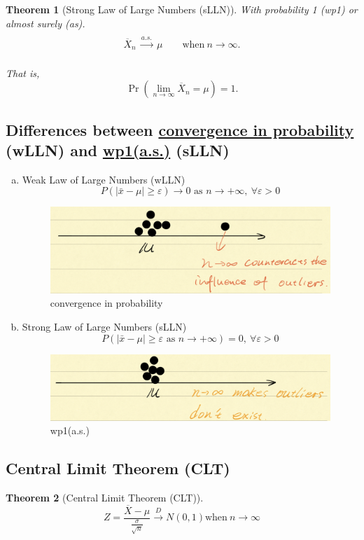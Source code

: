 \documentclass[11pt,a4paper]{article}
\newtheorem{theorem}{Theorem}
\begin{document}
\begin{theorem}[Strong Law of Large Numbers (sLLN)]
    \quad

    With probability 1 (wp1) or almost surely (as).
    $${\displaystyle {\begin{matrix}{}\\{\overline {X}}_{n}\ {\xrightarrow {a.s.}}\ \mu \qquad {\text{when}}\ n\to \infty .\\{}\end{matrix}}}$$

    That is,
    $$\Pr \!\left(\lim _{n\to \infty }{\overline {X}}_{n}=\mu \right)=1.$$
\end{theorem}

\subsection{Differences between \underline{convergence in probability} (wLLN) and \underline{wp1(a.s.)} (sLLN)}
\begin{enumerate}[a)]
    \item Weak Law of Large Numbers (wLLN)
    $$P(|\bar{x}-\mu|\geq\varepsilon)\rightarrow 0\text{ as }n \rightarrow	+\infty,\ \forall \varepsilon>0$$
    \begin{center}\begin{figure}[htbp]
        \centering
        \includegraphics[scale=0.3]{wLLN.png}
        \caption{convergence in probability}
        \label{}
    \end{figure}\end{center}
    \item Strong Law of Large Numbers (sLLN)
    $$P(|\bar{x}-\mu|\geq\varepsilon\text{ as }n \rightarrow+\infty)=0,\ \forall \varepsilon>0$$
    \begin{center}\begin{figure}[htbp]
        \centering
        \includegraphics[scale=0.3]{sLLN.png}
        \caption{wp1(a.s.)}
        \label{}
    \end{figure}\end{center}
\end{enumerate}

\subsection{Central Limit Theorem (CLT)}
\begin{theorem}[Central Limit Theorem (CLT)]
    $$Z=\frac{\overline{X}-\mu}{\frac{\sigma}{\sqrt{n}}} \xrightarrow {D} N(0,1) \text{when}\ n\to \infty$$
\end{theorem}
\end{document}
